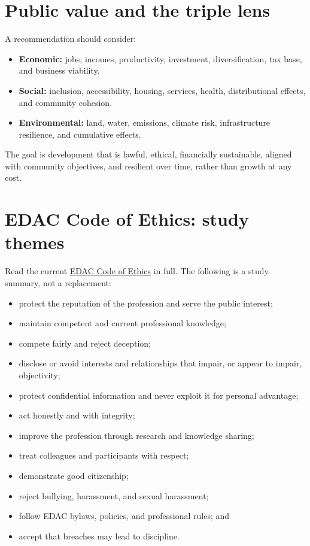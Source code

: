 \documentclass[11pt,letterpaper,oneside,openany]{book}
\begin{document}
\section[Public value and the triple lens]{Public value and the triple lens}
A recommendation should consider:


\begin{itemize}
\item \textbf{Economic:} jobs, incomes, productivity, investment, diversification, tax base, and business viability.
\item \textbf{Social:} inclusion, accessibility, housing, services, health, distributional effects, and community cohesion.
\item \textbf{Environmental:} land, water, emissions, climate risk, infrastructure resilience, and cumulative effects.
\end{itemize}


The goal is development that is lawful, ethical, financially sustainable, aligned with community objectives, and resilient over time, rather than growth at any cost.


\section[EDAC Code of Ethics: study themes]{EDAC Code of Ethics: study themes}
Read the current \href{https://edac.ca/about/code-of-ethics/}{EDAC Code of Ethics} in full. The following is a study summary, not a replacement:


\begin{itemize}
\item protect the reputation of the profession and serve the public interest;
\item maintain competent and current professional knowledge;
\item compete fairly and reject deception;
\item disclose or avoid interests and relationships that impair, or appear to impair, objectivity;
\item protect confidential information and never exploit it for personal advantage;
\item act honestly and with integrity;
\item improve the profession through research and knowledge sharing;
\item treat colleagues and participants with respect;
\item demonstrate good citizenship;
\item reject bullying, harassment, and sexual harassment;
\item follow EDAC bylaws, policies, and professional rules; and
\item accept that breaches may lead to discipline.
\end{itemize}
\end{document}
